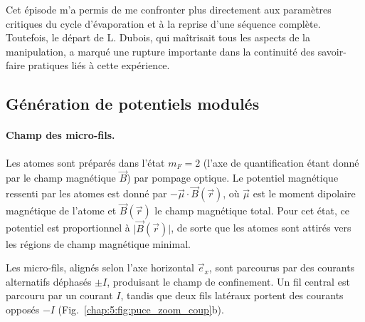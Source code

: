 \medskip

Cet épisode m’a permis de me confronter plus directement aux paramètres critiques du cycle d’évaporation et à la reprise d’une séquence complète. Toutefois, le départ de L. Dubois, qui maîtrisait tous les aspects de la manipulation, a marqué une rupture importante dans la continuité des savoir-faire pratiques liés à cette expérience.





\subsection{Génération de potentiels modulés}


\paragraph{Champ des micro-fils.}
Les atomes sont préparés dans l'état $m_F = 2$  (l'axe de quantification étant donné par le champ magnétique $\vec{B}$) par pompage optique. Le potentiel magnétique ressenti par les atomes est donné par $-\vec{\mu} \cdot \vec{B}(\vec{r})$, où $\vec{\mu}$ est le moment dipolaire magnétique de l'atome et $\vec{B}(\vec{r})$ le champ magnétique total. Pour cet état, ce potentiel est proportionnel à $\vert \vec{B}(\vec{r}) \vert$, de sorte que les atomes sont attirés vers les régions de champ magnétique minimal.

\medskip  

Les micro-fils, alignés selon l’axe horizontal $\vec{e}_x$, sont parcourus par des courants alternatifs déphasés $\pm I$, produisant le champ de confinement. Un fil central est parcouru par un courant $I$, tandis que deux fils latéraux portent des courants opposés $-I$ (Fig.~\ref{chap:5:fig:puce_zoom_coup}b).


